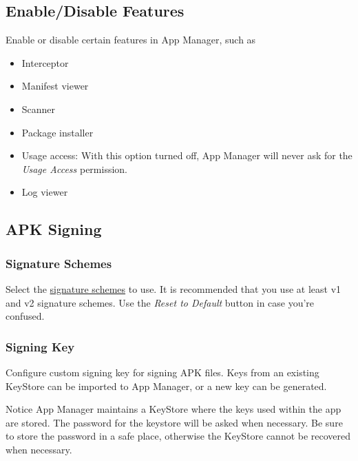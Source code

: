 \subsection{Enable/Disable Features}\label{subsec:enable/disable-features} %
Enable or disable certain features in App Manager, such as
\begin{itemize}
    \item Interceptor
    \item Manifest viewer
    \item Scanner
    \item Package installer
    \item Usage access: With this option turned off, App Manager will never ask for the \textit{Usage Access} permission.
    \item Log viewer
\end{itemize}


\subsection{APK Signing}\label{subsec:apk-signing} %

\subsubsection{Signature Schemes} %
Select the \href{https://source.android.com/security/apksigning}{signature schemes} to use.
It is recommended that you use at least v1 and v2 signature schemes.
Use the \textit{Reset to Default} button in case you're confused.

\subsubsection{Signing Key} %
Configure custom signing key for signing APK files.
Keys from an existing KeyStore can be imported to App Manager, or a new key can be generated.

\begin{warning}{Notice}
    App Manager maintains a KeyStore where the keys used within the app are stored.
    The password for the keystore will be asked when necessary.
    Be sure to store the password in a safe place, otherwise the KeyStore cannot be recovered when necessary.
\end{warning}


